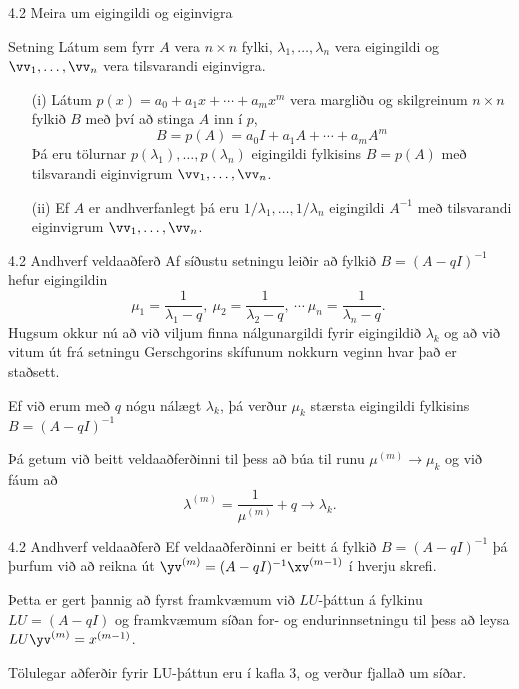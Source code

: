 \begin{frame}{4.2 Meira um eigingildi og eiginvigra} 
\begin{block}{Setning} 
Látum sem fyrr $A$ vera $n\times n$ fylki, $\lambda_1,\dots,\lambda_n$
vera eigingildi og $\vv_1,\dots,\vv_n$ vera  tilsvarandi eiginvigra.
\begin{enumerate}
\item [(i)] Látum 
$p(x)=a_0+a_1x+\cdots+a_mx^m$ vera margliðu og skilgreinum $n\times n$
fylkið $B$ með því að stinga $A$ inn í $p$,
$$
B=p(A)=a_0I+a_1A+\cdots+a_mA^m
$$
Þá eru tölurnar $p(\lambda_1),\dots,p(\lambda_n)$ eigingildi fylkisins
$B=p(A)$ með tilsvarandi eiginvigrum $\vv_1,\dots,\vv_n$.
\item [(ii)] Ef $A$ er andhverfanlegt þá eru
$1/\lambda_1,\dots,1/\lambda_n$ eigingildi $A^{-1}$ 
með tilsvarandi eiginvigrum $\vv_1,\dots,\vv_n$.
\end{enumerate}
\end{block}
\end{frame}

\begin{frame}{4.2 Andhverf veldaaðferð} 
Af síðustu setningu leiðir að fylkið $B=(A-qI)^{-1}$ hefur eigingildin
$$
\mu_1=\dfrac 1{\lambda_1-q},\ 
\mu_2=\dfrac 1{\lambda_2-q},\ \cdots \  
\mu_n=\dfrac 1{\lambda_n-q}.\ 
$$
Hugsum okkur nú að við viljum finna nálgunargildi fyrir 
eigingildið $\lambda_k$ og að við vitum út frá setningu Gerschgorins 
skífunum nokkurn veginn hvar það er staðsett.  

\pause
\smallskip
Ef við erum með $q$
nógu nálægt $\lambda_k$, þá verður $\mu_k$ stærsta eigingildi
fylkisins $B=(A-qI)^{-1}$

\pause
\smallskip
Þá getum við beitt veldaaðferðinni til þess að búa til runu 
$\mu^{(m)}\to \mu_k$ og við fáum að
$$
\lambda^{(m)}=\dfrac 1{\mu^{(m)}}+q\to \lambda_k. 
$$
\end{frame}

\begin{frame}{4.2 Andhverf veldaaðferð} 
Ef veldaaðferðinni er beitt á fylkið $B=(A-qI)^{-1}$ þá þurfum við að 
reikna út $\yv^{(m)}=(A-qI)^{-1}\xv^{(m-1)}$ í hverju skrefi.

\pause
\smallskip
Þetta er gert þannig að fyrst framkvæmum við $LU$-þáttun á 
fylkinu $LU=(A-qI)$ og framkvæmum síðan for- og endurinnsetningu
til þess að leysa $LU\yv^{(m)}=x^{(m-1)}$. 

\pause
\smallskip
Tölulegar aðferðir fyrir LU-þáttun eru í kafla 3, og verður fjallað um síðar.
\end{frame}


